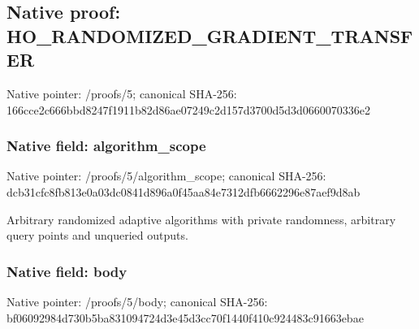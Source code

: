 \documentclass[10pt,a4paper]{article}
\begin{document}
\subsection{Native proof: HO\_\allowbreak{}RANDOMIZED\_\allowbreak{}GRADIENT\_\allowbreak{}TRANSFER}
Native pointer: /proofs/5; canonical SHA-256: 166cce2c666bbd8247f1911b82d86ae07249c2d157d3700d5d3d0660070336e2

\subsubsection{Native field: algorithm\_\allowbreak{}scope}
Native pointer: /proofs/5/algorithm\_\allowbreak{}scope; canonical SHA-256: dcb31cfc8fb813e0a03dc0841d896a0f45aa84e7312dfb6662296e87aef9d8ab

\begingroup\raggedright\sloppy Arbitrary randomized adaptive algorithms with private randomness,\allowbreak{} arbitrary query points and unqueried outputs.\par\endgroup

\subsubsection{Native field: body}
Native pointer: /proofs/5/body; canonical SHA-256: bf06092984d730b5ba831094724d3e45d3cc70f1440f410c924483c91663ebae
\end{document}

